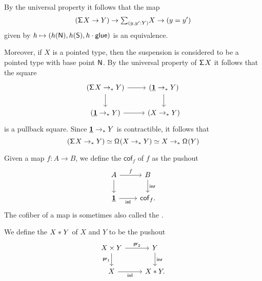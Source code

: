 \begin{rmk}By the universal property it follows that the map
\begin{equation*}
(\susp X \to Y) \to \sm{y,y':Y}X\to (y=y')
\end{equation*}
given by $h\mapsto (h(\mathsf{N}),h(\mathsf{S}),h\cdot\mathsf{glue})$ is an equivalence. 

Moreover, if $X$ is a pointed type, then the suspension is considered to be a pointed type with base point $\mathsf{N}$. By the universal property of $\mathsf{\Sigma}^{} X$ it follows that the square
\begin{equation*}
\begin{tikzcd}
(\susp X\to_\ast Y) \arrow[r] \arrow[d] & (\unit \to_\ast Y) \arrow[d] \\
(\unit\to_\ast Y) \arrow[r] & (X\to_\ast Y)
\end{tikzcd}
\end{equation*}
is a pullback square. Since $\underline{\mathbf{1}}\to_\ast Y$ is contractible, it follows that 
\begin{equation*}
(\mathsf{\Sigma}^{} X\to_\ast Y) \simeq \mathsf{\Omega}^{}(X\to_\ast Y) \simeq X \to_\ast \mathsf{\Omega}^{}(Y)
\end{equation*}
\end{rmk}

\begin{defn}
Given a map $f:A\to B$, we define the  $\mathsf{cof}_f$ of $f$ as the pushout
\begin{equation*}
\begin{tikzcd}
A \arrow[r,"f"] \arrow[d] & B \arrow[d,"\inr"] \\
\unit \arrow[r,swap,"\inl"] & \mathsf{cof}_f. 
\end{tikzcd}
\end{equation*}
The cofiber of a map is sometimes also called the .
\end{defn}

\begin{defn}
We define the  ${X}\ast_{}{Y}$ of $X$ and $Y$ to be the pushout 
\begin{equation*}
\begin{tikzcd}
X\times Y \arrow[r,"\proj 2"] \arrow[d,swap,"\proj 1"] & Y \arrow[d,"\inr"] \\
X \arrow[r,swap,"\inl"] & X \ast Y. 
\end{tikzcd}
\end{equation*}
\end{defn}

